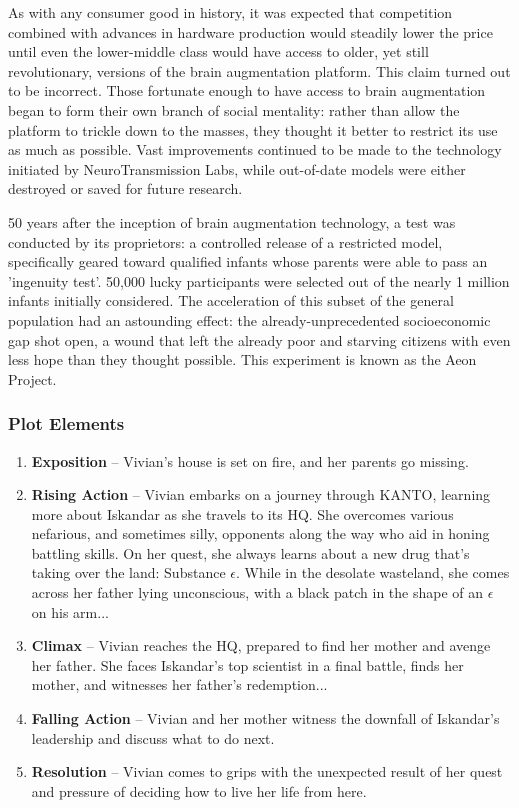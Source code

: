 \documentclass[12pt,titlepage]{article}
\newcommand\evilcorp{Iskandar\xspace}
\newcommand\world{KANTO\xspace}
\begin{document}
As with any consumer good in history, it was expected that competition combined
with advances in hardware production would steadily lower the price until even
the lower-middle class would have access to older, yet still revolutionary,
versions of the brain augmentation platform. This claim turned out to be
incorrect. Those fortunate enough to have access to brain augmentation began to
form their own branch of social mentality: rather than allow the platform to
trickle down to the masses, they thought it better to restrict its use as much
as possible. Vast improvements continued to be made to the technology initiated
by NeuroTransmission Labs, while out-of-date models were either destroyed or
saved for future research.

50 years after the inception of brain augmentation technology, a test was
conducted by its proprietors: a controlled release of a restricted model,
specifically geared toward qualified infants whose parents were able to pass an
'ingenuity test'. 50,000 lucky participants were selected out of the nearly 1
million infants initially considered. The acceleration of this subset of the
general population had an astounding effect: the already-unprecedented
socioeconomic gap shot open, a wound that left the already poor and starving
citizens with even less hope than they thought possible. This experiment is
known as the Aeon Project.

\subsubsection{Plot Elements}

\begin{enumerate}
    \item {\bf Exposition} -- Vivian's house is set on fire, and her parents go
        missing.
    \item {\bf Rising Action} -- Vivian embarks on a journey through \world,
        learning more about \evilcorp as she travels to its HQ. She overcomes
        various nefarious, and sometimes silly, opponents along the way who aid
        in honing battling skills. On her quest, she always learns about a new
        drug that's taking over the land: Substance $\epsilon$. While in the
        desolate wasteland, she comes across her father lying unconscious, with
        a black patch in the shape of an $\epsilon$ on his arm...
    \item {\bf Climax} -- Vivian reaches the HQ, prepared to find her mother and
        avenge her father. She faces \evilcorp's top scientist in a final
        battle, finds her mother, and witnesses her father's redemption...
    \item {\bf Falling Action} -- Vivian and her mother witness the downfall of
        \evilcorp's leadership and discuss what to do next.
    \item {\bf Resolution} -- Vivian comes to grips with the unexpected result
        of her quest and pressure of deciding how to live her life from here.
\end{enumerate}
\end{document}

